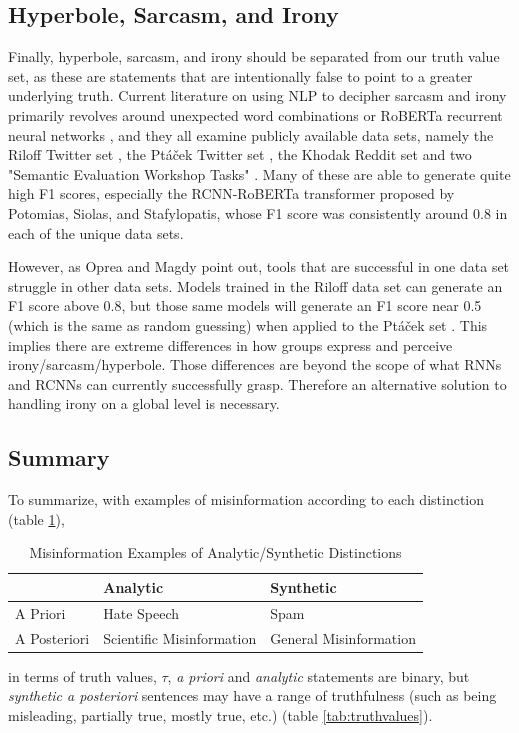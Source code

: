 \documentclass[preprint,review,12pt]{elsarticle}
\begin{document}
\subsection{Hyperbole, Sarcasm, and Irony}
\label{hyperbole}
Finally, hyperbole, sarcasm, and irony should be separated from our truth value set, as these are statements that are intentionally false to point to a greater underlying truth. 
Current literature on using NLP to decipher sarcasm and irony primarily revolves around unexpected word combinations \cite{barbieri2014modelling,buschmeier2014impact,ghosh2015sarcastic} or RoBERTa recurrent neural networks \cite{potamias2020transformer}, and they all examine publicly available data sets, namely the Riloff Twitter set \cite{riloff2013sarcasm}, the Pt{\'a}{\v{c}}ek Twitter set \cite{ptavcek2014sarcasm}, the Khodak Reddit set \cite{khodak2017large} and two "Semantic Evaluation Workshop Tasks" \cite{van2018semeval,ghosh2015semeval}. Many of these are able to generate quite high F1 scores, especially the RCNN-RoBERTa transformer proposed by Potomias, Siolas, and Stafylopatis, whose F1 score was consistently around 0.8 in each of the unique data sets. 

However, as Oprea and Magdy point out, tools that are successful in one data set struggle in other data sets. Models trained in the Riloff data set can generate an F1 score above 0.8, but those same models will generate an F1 score near 0.5 (which is the same as random guessing) when applied to the Pt{\'a}{\v{c}}ek set \cite{oprea2019exploring}. This implies there are extreme differences in how groups express and perceive irony/sarcasm/hyperbole. Those differences are beyond the scope of what RNNs and RCNNs can currently successfully grasp. Therefore an alternative solution to handling irony on a global level is necessary.
\subsection{Summary}
\label{truthvalueappendixsummary}
To summarize, with examples of misinformation according to each distinction (table \ref{tab:misinformationexamples}),
\begin{table}[htbp]
    \centering
    \begin{tabular}{ |p{3cm}|p{5cm}|p{5cm}|}
    \hline
    & Analytic & Synthetic\\
    \hline
    A Priori & Hate Speech & Spam\\
    \hline
    A Posteriori &  Scientific Misinformation  & General Misinformation\\
    \hline
    \end{tabular}
    \caption{Misinformation Examples of Analytic/Synthetic Distinctions}
    \label{tab:misinformationexamples}
\end{table}
in terms of truth values, $\tau$, \textit{a priori} and \textit{analytic} statements are binary, but \textit{synthetic a posteriori} sentences may have a range of truthfulness (such as being misleading, partially true, mostly true, etc.) (table \ref{tab:truthvalues}).
\end{document}
